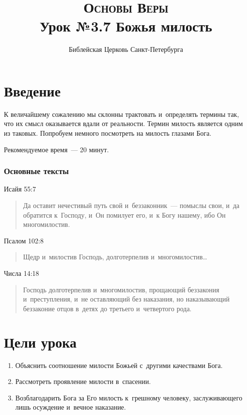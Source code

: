 \documentclass[a4paper,12pt]{article}
\title{\textsc{Основы Веры}\\Урок №3.7 Божья милость}
\author{Библейская Церковь Санкт-Петербурга}
\date{}
\begin{document}
\maketitle

\thispagestyle{empty}

\tableofcontents

\section*{Введение}

К величайшему сожалению мы склонны трактовать и~определять термины так, что их смысл оказывается вдали от реальности. Термин милость является одним из таковых. Попробуем немного посмотреть на милость глазами Бога.

Рекомендуемое время~--- 20 минут.
        
\subsubsection*{Основные тексты}

\noindent Исайя 55:7

\begin{quote}
Да оставит нечестивый путь свой и~беззаконник~--- помыслы свои, и~да обратится к~Господу, и~Он помилует его, и~к Богу нашему, ибо Он многомилостив. 
\end{quote}

\noindent Псалом 102:8

\begin{quote}
Щедр и~милостив Господь, долготерпелив и~многомилостив\ldots 
\end{quote}

\noindent Числа 14:18
\begin{quote}
Господь долготерпелив и~многомилостив, прощающий беззакония и~преступления, и~не оставляющий без наказания, но наказывающий беззаконие отцов в~детях до третьего и~четвертого рода.
\end{quote}

\section*{Цели урока}

\begin{enumerate}
    \item Объяснить соотношение милости Божьей с~другими качествами Бога.
    \item Рассмотреть проявление милости в~спасении.
    \item Возблагодарить Бога за Его милость к~грешному человеку, заслуживающего лишь осуждение и~вечное наказание.
\end{enumerate}
\end{document}
